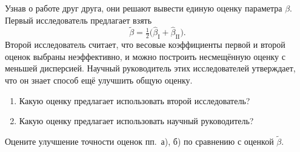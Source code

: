 Узнав о работе друг друга, они решают вывести единую оценку параметра $\beta$.
Первый исследователь предлагает взять
\[
  \widetilde{\beta} = \tfrac{1}{2}\bigl(\widehat{\beta}_{\mathrm{I}} + \widehat{\beta}_{\mathrm{II}}\bigr).
\]
Второй исследователь считает, что весовые коэффициенты первой и второй оценок
выбраны неэффективно, и можно построить несмещённую оценку с меньшей дисперсией.
Научный руководитель этих исследователей утверждает, что он знает способ ещё
улучшить общую оценку.
\begin{enumerate}[label=\asbuk*), leftmargin=2.2em, itemsep=3pt]
  \item Какую оценку предлагает использовать второй исследователь?
  \item Какую оценку предлагает использовать научный руководитель?
\end{enumerate}
Оцените улучшение точности оценок пп.~а), б) по сравнению с оценкой
$\widetilde{\beta}$.

